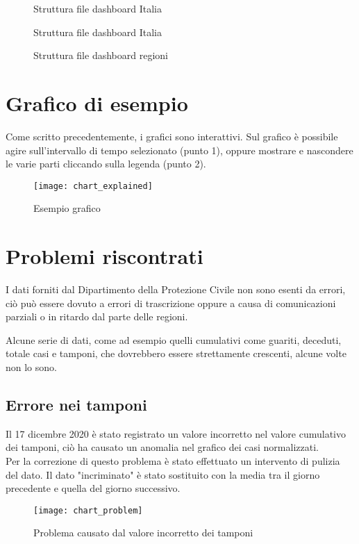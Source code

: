 \begin{figure}
\centering
\begin{minipage}{.3\linewidth}
\caption{Struttura file dashboard Italia}
\end{minipage}\hfill
\begin{minipage}{.65\linewidth}
\caption{Struttura file dashboard Italia}
\end{minipage}
\end{figure}


\begin{figure}
\centering
\begin{minipage}{.3\linewidth}
\caption{Struttura file dashboard regioni}
\end{minipage}\hfill
\end{figure}

\section{Grafico di esempio}
Come scritto precedentemente, i grafici sono interattivi.
Sul grafico è possibile agire sull'intervallo di tempo selezionato (punto 1), oppure mostrare e nascondere le varie parti cliccando sulla legenda (punto 2).
\begin{figure}[htp]
    \centering
    \texttt{[image: chart\_explained]}
    \caption{Esempio grafico}
\end{figure}

\section{Problemi riscontrati}
I dati forniti dal Dipartimento della Protezione Civile non sono esenti da errori, ciò può essere dovuto a errori di trascrizione oppure a causa di comunicazioni parziali o in ritardo dal parte delle regioni.

\noindent Alcune serie di dati, come ad esempio quelli cumulativi come guariti, deceduti, totale casi e tamponi, che dovrebbero essere strettamente crescenti, alcune volte non lo sono.

\subsection{Errore nei tamponi}
Il 17 dicembre 2020 è stato registrato un valore incorretto nel valore cumulativo dei tamponi, ciò ha causato un anomalia nel grafico dei casi normalizzati.\\
Per la correzione di questo problema è stato effettuato un intervento di pulizia del dato.
Il dato "incriminato" è stato sostituito con la media tra il giorno precedente e quella del giorno successivo.
\begin{figure}[htp]
    \centering
    \texttt{[image: chart\_problem]}
    \caption{Problema causato dal valore incorretto dei tamponi}
\end{figure}


